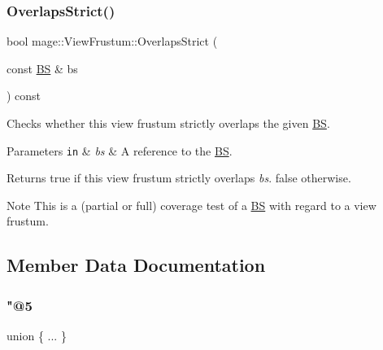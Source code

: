 \subsubsection{\texorpdfstring{Overlaps\+Strict()}{OverlapsStrict()}\hspace{0.1cm}{\footnotesize\ttfamily [2/2]}}
{\footnotesize\ttfamily bool mage\+::\+View\+Frustum\+::\+Overlaps\+Strict (\begin{DoxyParamCaption}\item[{const \hyperlink{structmage_1_1_b_s}{BS} \&}]{bs }\end{DoxyParamCaption}) const\hspace{0.3cm}{\ttfamily [noexcept]}}

Checks whether this view frustum strictly overlaps the given \hyperlink{structmage_1_1_b_s}{BS}.


\begin{DoxyParams}[1]{Parameters}
\mbox{\tt in}  & {\em bs} & A reference to the \hyperlink{structmage_1_1_b_s}{BS}. \\
\hline
\end{DoxyParams}
\begin{DoxyReturn}{Returns}
{\ttfamily true} if this view frustum strictly overlaps {\itshape bs}. {\ttfamily false} otherwise. 
\end{DoxyReturn}
\begin{DoxyNote}{Note}
This is a (partial or full) coverage test of a \hyperlink{structmage_1_1_b_s}{BS} with regard to a view frustum. 
\end{DoxyNote}


\subsection{Member Data Documentation}
\hypertarget{structmage_1_1_view_frustum_a800a90316937b1848ea02aa785ba7072}{}\label{structmage_1_1_view_frustum_a800a90316937b1848ea02aa785ba7072} 
\subsubsection{\texorpdfstring{"@5}{@5}}
{\footnotesize\ttfamily union \{ ... \} \hspace{0.3cm}{\ttfamily [private]}}

\hypertarget{structmage_1_1_view_frustum_a66ea2332f1c30b7a1d3ba8f0f0fed347}{}\label{structmage_1_1_view_frustum_a66ea2332f1c30b7a1d3ba8f0f0fed347} 
